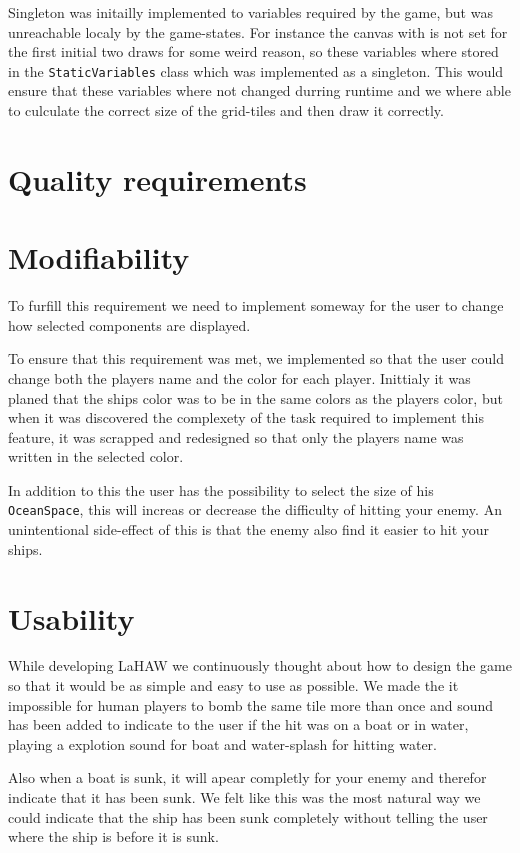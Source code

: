 Singleton was initailly implemented to variables required by the game, but was unreachable localy by the game-states.
For instance the canvas with is not set for the first initial two draws for some weird reason, so these variables where stored in the \texttt{StaticVariables} class which was implemented as a singleton. This would ensure that these variables where not changed durring runtime and we where able to culculate the correct size of the grid-tiles and then draw it correctly.


\section{Quality requirements}

\section{Modifiability}
To furfill this requirement we need to implement someway for the user to change how selected components are displayed.

To ensure that this requirement was met, we implemented so that the user could change both the players name and the color for each player. Inittialy it was planed that the ships color was to be in the same colors as the players color, but when it was discovered the complexety of the task required to implement this feature, it was scrapped and redesigned so that only the players name was written in the selected color.

In addition to this the user has the possibility to select the size of his \texttt{OceanSpace}, this will increas or decrease the difficulty of hitting your enemy. An unintentional side-effect of this is that the enemy also find it easier to hit your ships.


\section{Usability}
While developing LaHAW we continuously thought about how to design the game so that it would be as simple and easy to use as possible. We made the it impossible for human players to bomb the same tile more than once and sound has been added to indicate to the user if the hit was on a boat or in water, playing a explotion sound for boat and water-splash for hitting water.

Also when a boat is sunk, it will apear completly for your enemy and therefor indicate that it has been sunk. We felt like this was the most natural way we could indicate that the ship has been sunk completely without telling the user where the ship is before it is sunk.

